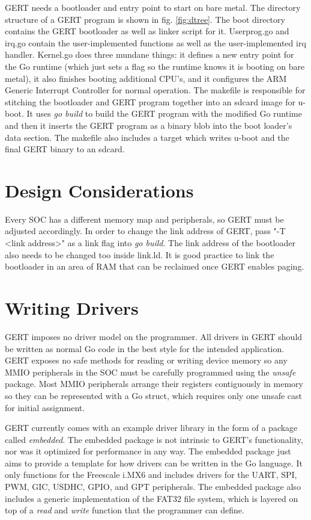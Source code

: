 GERT needs a bootloader
and entry point to start on bare metal. The directory structure of a GERT
program is shown in fig. \ref{fig:dtree}. The boot directory contains the GERT
bootloader as well as linker script for it. Userprog.go and irq.go contain
the user-implemented functions as well as the user-implemented irq handler.
Kernel.go does three mundane things: it defines a new entry point for the Go runtime
(which just sets a flag so the runtime knows it is booting on bare metal),
it also finishes booting additional CPU's, and it configures the ARM Generic Interrupt Controller for normal operation. The makefile
is responsible for stitching the bootloader and GERT program together into an
sdcard image for u-boot. It uses \textit{go build} to build the GERT program
with the modified Go runtime and then it inserts the GERT program as a binary blob
into the boot loader's data section. The makefile also includes a target which writes
u-boot and the final GERT binary to an sdcard.

\section{Design Considerations}
Every SOC has a different memory map and peripherals, so GERT must be adjusted
accordingly. In order to change the link address of GERT, pass "-T <link address>"
as a link flag into \textit{go build}. The link address of the bootloader also needs
to be changed too inside link.ld. It is good practice to link the bootloader in an
area of RAM that can be reclaimed once GERT enables paging.

\section{Writing Drivers}
GERT imposes no driver model on the programmer. All drivers in
GERT should be written as normal Go code in the best style for
the intended application. GERT exposes no safe methods for reading
or writing device memory so any MMIO peripherals in the SOC must be
carefully programmed using the \textit{unsafe} package. Most MMIO
peripherals arrange their registers contiguously in memory so they
can be represented with a Go struct, which requires only one unsafe cast
for initial assignment.

GERT currently comes with an example driver
library in the form of a package called \textit{embedded}. The embedded package is not intrinsic to GERT's
functionality, nor was it optimized for performance in any way. The embedded package
just aims to provide a template for how drivers can be written in the Go language.
It only functions for the Freescale i.MX6 and includes drivers for the UART, SPI, PWM, GIC, USDHC, GPIO, and GPT peripherals.
The embedded package also includes a generic implementation of the FAT32 file system, which is
layered on top of a \textit{read} and \textit{write} function that the programmer can define.


